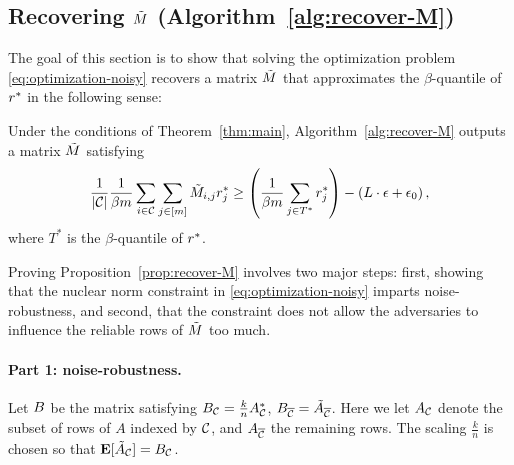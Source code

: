 \subsection{Recovering $\tilde{M}$ (Algorithm~\ref{alg:recover-M})}
\label{sec:approach-M}

The goal of this section is to show that solving the optimization 
problem \eqref{eq:optimization-noisy} recovers a matrix $\tilde{M}$ that 
approximates the $\beta$-quantile of $r^*$ in the following sense:
\begin{proposition}
\label{prop:recover-M}
Under the conditions of Theorem~\ref{thm:main}, Algorithm~\ref{alg:recover-M} 
outputs a matrix $\tilde{M}$ satisfying 
\[ \frac{1}{|\mathcal{C}|} \frac{1}{\beta m} \sum_{i \in \mathcal{C}} \sum_{j \in [m]} \tilde{M}_{i,j}r^*_j \geq \left( \frac{1}{\beta m} \sum_{j \in T^*} r^*_j \right) - \left( L \cdot \epsilon + \epsilon_0 \right), \]
where $T^*$ is the $\beta$-quantile of $r^*$.
\end{proposition}
Proving Proposition~\ref{prop:recover-M} involves two major steps: first, 
showing that the nuclear norm constraint in \eqref{eq:optimization-noisy} 
imparts noise-robustness, and second, that the constraint does not allow 
the adversaries to influence the reliable rows of $\tilde{M}$ too much.

\paragraph{Part 1: noise-robustness.} Let $B$ be the matrix satisfying 
$B_{\mathcal{C}} = \frac{k}{n}A^*_{\mathcal{C}}$, $B_{\overline{\mathcal{C}}} = \tilde{A}_{\overline{\mathcal{C}}}$. Here we 
let $A_{\mathcal{C}}$ denote the subset of rows of $A$ indexed by $\mathcal{C}$, and 
$A_{\overline{\mathcal{C}}}$ the remaining rows. The scaling $\frac{k}{n}$ is chosen so that 
$\mathbf{E}[\tilde{A}_{\mathcal{C}}] = B_{\mathcal{C}}$.

